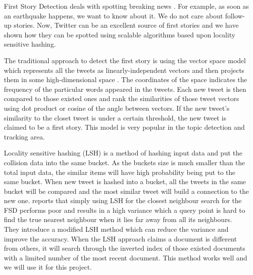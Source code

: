 \documentclass[a4paper,12pt]{article}
\begin{document}
First Story Detection deals with spotting breaking news \cite{Allan:2002:TDT:772260}. For example, as soon as an earthquake happens, we want to know about it. We do not care about follow-up stories. Now, Twitter can be an excellent source of first stories and we have shown how they can be spotted using scalable algorithms based upon locality sensitive hashing. \newline


The traditional approach to detect the first story is using the vector space model which represents all the tweets as linearly-independent vectors and then projects them in some high-dimensional space \cite{Yang:1998:SRO:290941.290953}. The coordinates of the space indicates the frequency of the particular words appeared in the tweets. Each new tweet is then compared to those existed ones and rank the similarities of those tweet vectors using dot product or cosine of the angle between vectors. If the new tweet’s similarity to the closet tweet is under a certain threshold, the new tweet is claimed to be a first story. This model is very popular in the topic detection and tracking area. \newline

Locality sensitive hashing (LSH) is a method of hashing input data and put the collision data into the same bucket. As the buckets size is much smaller than the total input data, the similar items will have high probability being put to the same bucket. When new tweet is hashed into a bucket, all the tweets in the same bucket will be compared and the most similar tweet will build a connection to the new one.  \citep{Petrovic:2010} reports that simply using LSH for the closest neighbour search for the FSD performs poor and results in a high variance which a query point is hard to find the true nearest neighbour when it lies far away from all its neighbours. They introduce a modified LSH method which can reduce the variance and improve the accuracy. When the LSH approach claims a document is different from others, it will search through the inverted index of those existed documents with a limited number of the most recent document. This method works well and we will use it for this project. \newline
\end{document}

